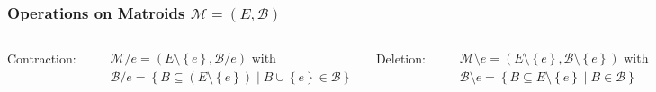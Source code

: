 \documentclass{beamer}
\newcommand{\tupel}[1]{\left(#1\right)}
\newcommand{\set}[1]{\left\{#1\right\}}
\begin{document}
\begin{frame}
  \frametitle{Operations on Matroids $\mathcal{M} = \tupel{E, \mathcal{B}}$}
  \begin{columns}
    \begin{center}
      Contraction:
    \end{center}
    \vspace{-0.6cm}
    \begin{align*}
      &\mathcal{M}/e = \tupel{E\setminus\set{e}, \mathcal{B}/e}\text{ with}\\
      &\mathcal{B}/e = \set{B\subseteq (E\setminus\set{e})\middle| B\cup\set{e}\in\mathcal{B}}
    \end{align*}
    \column<4->{0.5\textwidth}
    \begin{center}
      Deletion:
    \end{center}
    \vspace{-0.6cm}
    \begin{align*}
      &\mathcal{M}\setminus e = \tupel{E\setminus\set{e},\mathcal{B}\setminus \set{e}}\text{ with}\\
      &\mathcal{B}\setminus e = \set{B\subseteq E\setminus\set{e}\middle|B\in\mathcal{B}}
    \end{align*}
  \end{columns}
  \begin{center}
  \end{center}
\end{frame}
\end{document}
